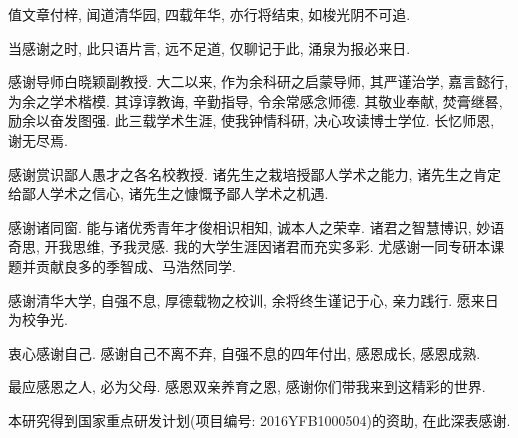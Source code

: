 \begin{acknowledgement}
值文章付梓, 闻道清华园, 四载年华, 亦行将结束, 如梭光阴不可追.

当感谢之时, 此只语片言, 远不足道, 仅聊记于此, 涌泉为报必来日.

感谢导师白晓颖副教授. 大二以来, 作为余科研之启蒙导师, 其严谨治学, 嘉言懿行, 为余之学术楷模. 其谆谆教诲, 辛勤指导, 令余常感念师德. 其敬业奉献, 焚膏继晷, 励余以奋发图强. 此三载学术生涯, 使我钟情科研, 决心攻读博士学位. 长忆师恩, 谢无尽焉.

感谢赏识鄙人愚才之各名校教授. 诸先生之栽培授鄙人学术之能力, 诸先生之肯定给鄙人学术之信心, 诸先生之慷慨予鄙人学术之机遇.

感谢诸同窗. 能与诸优秀青年才俊相识相知, 诚本人之荣幸. 诸君之智慧博识, 妙语奇思, 开我思维, 予我灵感. 我的大学生涯因诸君而充实多彩. 尤感谢一同专研本课题并贡献良多的季智成、马浩然同学.

感谢清华大学, 自强不息, 厚德载物之校训, 余将终生谨记于心, 亲力践行. 愿来日为校争光.

衷心感谢自己. 感谢自己不离不弃, 自强不息的四年付出, 感恩成长, 感恩成熟.

最应感恩之人, 必为父母. 感恩双亲养育之恩, 感谢你们带我来到这精彩的世界.

本研究得到国家重点研发计划(项目编号: 2016YFB1000504)的资助, 在此深表感谢.

\end{acknowledgement}
